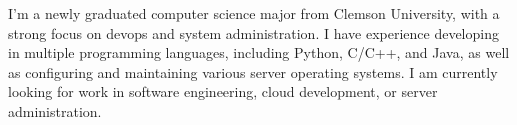 

\begin{cvparagraph}

I'm a newly graduated computer science major from Clemson University, with a strong focus on devops and system administration. I have experience developing in multiple programming languages, including Python, C/C++, and Java, as well as configuring and maintaining various server operating systems. I am currently looking for work in software engineering, cloud development, or server administration.
\end{cvparagraph}
